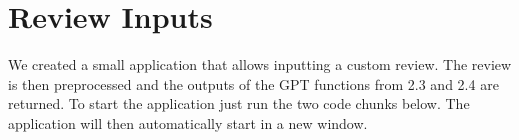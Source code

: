 \documentclass[
]{article}
\begin{document}
\hypertarget{review-inputs}{%
\section{Review Inputs}\label{review-inputs}}

We created a small application that allows inputting a custom review.
The review is then preprocessed and the outputs of the GPT functions
from 2.3 and 2.4 are returned. To start the application just run the two
code chunks below. The application will then automatically start in a
new window.
\end{document}
